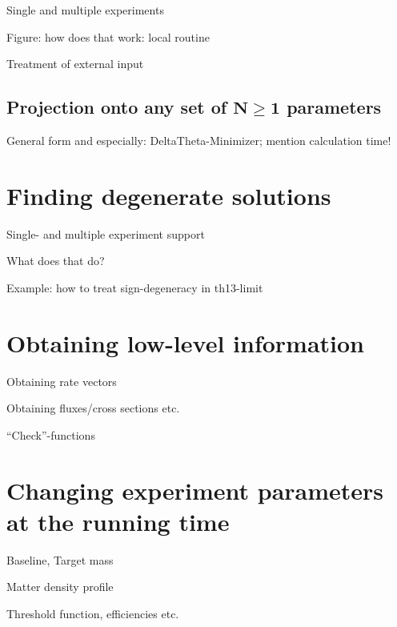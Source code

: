\bi
\item
 Single and multiple experiments
\item
 Figure: how does that work: local routine
\item
 Treatment of external input
\ei

\section[Projection onto any set of $N \ge 1$ parameters]{Projection onto any set of $\boldsymbol{N \ge 1}$ parameters}

General form and especially: DeltaTheta-Minimizer; mention calculation time!

\chapter{Finding degenerate solutions}

\bi
\item
 Single- and multiple experiment support
\item
 What does that do?
\item
 Example: how to treat sign-degeneracy in th13-limit
\ei

\chapter{Obtaining low-level information}

\bi
\item
 Obtaining rate vectors
\item
 Obtaining fluxes/cross sections etc.
\item
 ``Check''-functions
\ei

\chapter{Changing experiment parameters at the running time}

\bi
\item
 Baseline, Target mass
\item
 Matter density profile
\item
 Threshold function, efficiencies etc.
\ei
